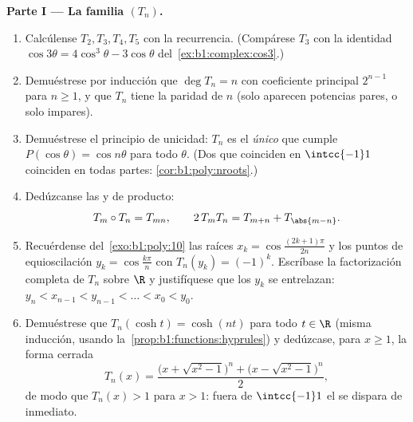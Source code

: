 \begin{problem}
\medskip
\noindent\textbf{Parte I --- La familia $(T_n)$.}
\begin{enumerate}
  \item Calcúlense $T_2, T_3, T_4, T_5$ con la recurrencia. (Compárese
        $T_3$ con la identidad $\cos3\theta = 4\cos^3\theta -
        3\cos\theta$ del~\cref{ex:b1:complex:cos3}.)
  \item Demuéstrese por inducción que $\deg T_n = n$ con coeficiente
        principal $2^{n-1}$ para $n \geq 1$, y que $T_n$ tiene la
        paridad de $n$ (solo aparecen potencias pares, o solo impares).
  \item Demuéstrese el principio de unicidad: $T_n$ es el \emph{único}
         que cumple $P(\cos\theta) = \cos n\theta$ para todo
        $\theta$. (Dos  que coinciden en $\intcc{-1}1$
        coinciden en todas partes: \cref{cor:b1:poly:nroots}.)
  \item Dedúzcanse las  y de producto:
        \[
        T_m \circ T_n = T_{mn},
        \qquad
        2\,T_m T_n = T_{m+n} + T_{\abs{m-n}} .
        \]
  \item Recuérdense del~\cref{exo:b1:poly:10} las raíces
        $x_k = \cos\frac{(2k+1)\pi}{2n}$ y los puntos de equioscilación
        $y_k = \cos\frac{k\pi}n$ con $T_n(y_k) = (-1)^k$. Escríbase la
        factorización completa de $T_n$ sobre $\R$ y justifíquese que
        los $y_k$ se entrelazan: $y_n < x_{n-1} < y_{n-1} < \dots <
        x_0 < y_0$.
  \item Demuéstrese que $T_n(\cosh t) = \cosh(nt)$ para todo
        $t \in \R$ (misma inducción, usando
        la~\cref{prop:b1:functions:hyprules}) y dedúzcase, para
        $x \geq 1$, la forma cerrada
        \[
        T_n(x) = \frac{\bigl(x + \sqrt{x^2 - 1}\bigr)^n +
        \bigl(x - \sqrt{x^2 - 1}\bigr)^n}{2} ,
        \]
        de modo que $T_n(x) > 1$ para $x > 1$: fuera de $\intcc{-1}1$
        el  se dispara de inmediato.
\end{enumerate}


\end{problem}
